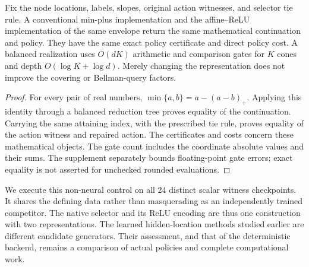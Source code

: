 \begin{proposition}\label{prop:representation47}
Fix the node locations, labels, slopes, original action witnesses, and selector tie rule. A conventional min-plus implementation and the affine--ReLU implementation of the same envelope return the same mathematical continuation and policy. They have the same exact policy certificate and direct policy cost. A balanced realization uses $O(dK)$ arithmetic and comparison gates for $K$ cones and depth $O(\log K+\log d)$. Merely changing the representation does not improve the covering or Bellman-query factors.
\end{proposition}
\begin{proof}
For every pair of real numbers, $\min\{a,b\}=a-(a-b)_+$. Applying this identity through a balanced reduction tree proves equality of the continuation. Carrying the same attaining index, with the prescribed tie rule, proves equality of the action witness and repaired action. The certificates and costs concern these mathematical objects. The gate count includes the coordinate absolute values and their sums. The supplement separately bounds floating-point gate errors; exact equality is not asserted for unchecked rounded evaluations.
\end{proof}

We execute this non-neural control on all 24 distinct scalar witness checkpoints. It shares the defining data rather than masquerading as an independently trained competitor. The native selector and its ReLU encoding are thus one construction with two representations. The learned hidden-location methods studied earlier are different candidate generators. Their assessment, and that of the deterministic backend, remains a comparison of actual policies and complete computational work.
